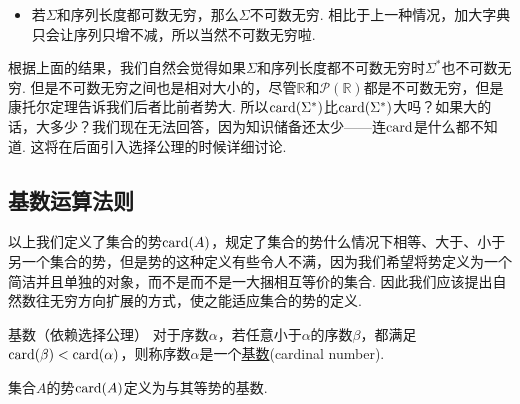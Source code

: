 \begin{itemize}
\begin{note}
        \begin{align*}
            a_0 &= 0.{\color{red}2} 1845\cdots \\
            a_1 &= 0.9{\color{red}8} 724\cdots \\
            a_2 &= 0.83{\color{red}1} 66\cdots \\
            a_3 &= 0.395{\color{red}7} 4\cdots \\
            a_4 &= 0.5836{\color{red}3}\cdots \\
            \cdots \\
            a^* &= 0.{\color{red}77747}\cdots
        \end{align*}
        这就充分说明了\(a^*\)没有被枚举出来，因此实数区间\((0,1)\)上的实数不可数. 康托尔1891年发表了这个证明. 当然，他在1879年的文章\textit{Ueber eine Eigenschaft des Inbegriffes aller reellen algebraischen Zahlen}中就已经用区间套的方法证明了连续统（实数区间）是不可数的，这篇文章尽管不到四页半，却被视为集合论的开山之作，它的发表标志着集合论的诞生.
    \end{note}
    \item 若\(\Sigma\)和序列长度都可数无穷，那么\(\Sigma\)不可数无穷. \newline
    相比于上一种情况，加大字典只会让序列只增不减，所以当然不可数无穷啦.
\end{itemize}

根据上面的结果，我们自然会觉得如果\(\Sigma\)和序列长度都不可数无穷时\(\Sigma^*\)也不可数无穷. 但是不可数无穷之间也是相对大小的，尽管\(\mathbb{R}\)和\(\mathcal{P}(\mathbb{R})\)都是不可数无穷，但是康托尔定理告诉我们后者比前者势大. 所以\({\rm card}(\Sigma^*)\)比\({\rm card}(\Sigma^*)\)大吗？如果大的话，大多少？我们现在无法回答，因为知识储备还太少——连\({\rm card}\)是什么都不知道. 这将在后面引入选择公理的时候详细讨论.

\subsection{基数运算法则}

以上我们定义了集合的势\({\rm card}(A)\)，规定了集合的势什么情况下相等、大于、小于另一个集合的势，但是势的这种定义有些令人不满，因为我们希望将势定义为一个简洁并且单独的对象，而不是而不是一大捆相互等价的集合. 因此我们应该提出自然数往无穷方向扩展的方式，使之能适应集合的势的定义.

\begin{definition}{基数（依赖选择公理）}
    对于序数\(\alpha\)，若任意小于\(\alpha\)的序数\(\beta\)，都满足\({\rm card}(\beta)<{\rm card}(\alpha)\)，则称序数\(\alpha\)是一个\underline{基数}(cardinal number).
    \par
    集合\(A\)的势\({\rm card}(A)\)定义为与其等势的基数.
\end{definition}

